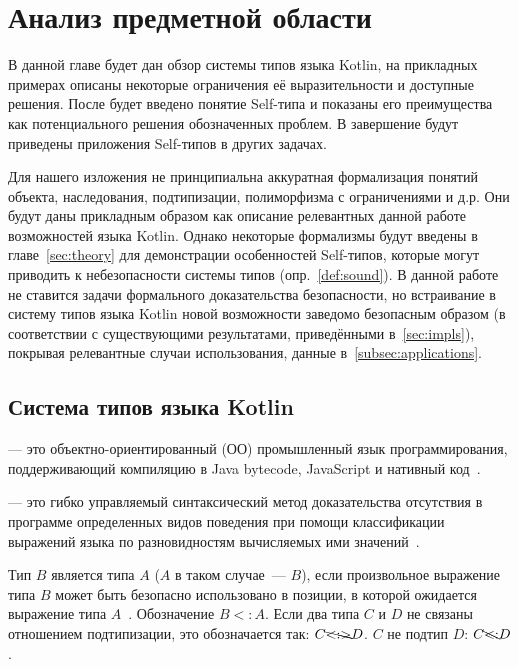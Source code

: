 

\section{Анализ предметной области}

В данной главе будет дан обзор системы типов языка Kotlin, на прикладных примерах описаны некоторые ограничения её выразительности и доступные решения.
После будет введено понятие Self-типа и показаны его преимущества как потенциального решения обозначенных проблем.
В завершение будут приведены приложения Self-типов в других задачах.

Для нашего изложения не принципиальна аккуратная формализация понятий объекта, наследования, подтипизации, полиморфизма с ограничениями и д.р.
Они будут даны прикладным образом как описание релевантных данной работе возможностей языка Kotlin.
Однако некоторые формализмы будут введены в главе~\ref{sec:theory} для демонстрации особенностей Self-типов, которые могут приводить к небезопасности системы типов (опр.~\ref{def:sound}).
В данной работе не ставится задачи формального доказательства безопасности, но встраивание в систему типов языка Kotlin новой возможности заведомо безопасным образом (в соответствии с существующими результатами, приведёнными в~\ref{sec:impls}), покрывая релевантные случаи использования, данные в~\ref{subsec:applications}.


\subsection{Система типов языка Kotlin} \label{subsec:kotlin-typesystem}

 --- это объектно-ориентированный (ОО) промышленный язык программирования, поддерживающий компиляцию в Java bytecode, JavaScript и нативный код~\cite{jemerov2017kotlin}.

\begin{definition}
     --- это гибко управляемый синтаксический метод доказательства отсутствия в программе определенных видов поведения при помощи классификации выражений языка по разновидностям вычисляемых ими значений~\cite{pierce2002types}.
\end{definition}

\begin{definition}
    \label{def:subtype}
    Тип $B$ является  типа $A$ ($A$ в таком случае~---  $B$), если произвольное выражение типа $B$ может быть безопасно использовано в позиции, в которой ожидается выражение типа $A$~\cite{liskov1987keynote, pierce2002types}.
    Обозначение $B <: A$.
    Если два типа $C$ и $D$ не связаны отношением подтипизации, это обозначается так: $C \bcancel{<:>} D$.
    $C$ не подтип $D$: $C \bcancel{<:} D$.
\end{definition}

